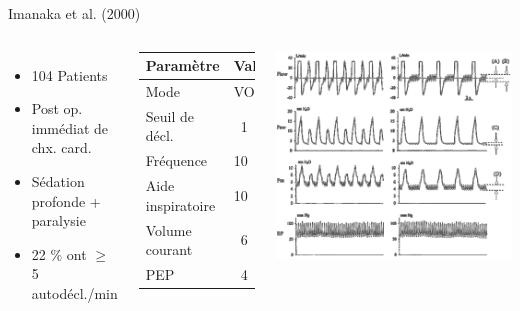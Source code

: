 \def\imanakacharacteristics{%
	\begin{itemize}
		\item 104 Patients
		\item Post op. immédiat de chx. card.
		\item Sédation profonde + paralysie
		\item 22 \% ont $\geq$  5 autodécl./min
	\end{itemize}
}

\def\imanakatable{%
	\begin{tabular}{lrl}
		Paramètre & \multicolumn{2}{l}{Valeur}\\
		\hline
		Mode & \multicolumn{2}{l}{VOI + AI}\\
		Seuil de décl. & 1 & l/m\\
		Fréquence & 10	& /min\\
		Aide inspiratoire	&	10 & mbar\\
		Volume courant & 6 & ml/kg\\
		PEP & 4 & mbar\\
	\end{tabular}
}

\begin{frame}{Imanaka et al. (2000)}
	\begin{columns}
		\imanakacharacteristics
		\vspace{\baselineskip}
		\hspace{20pt}\imanakatable
		\includegraphics[width=\textwidth, clip, trim=0 90 107 0]{captures/Imanaka-transparent}
	\end{columns}
\end{frame}
